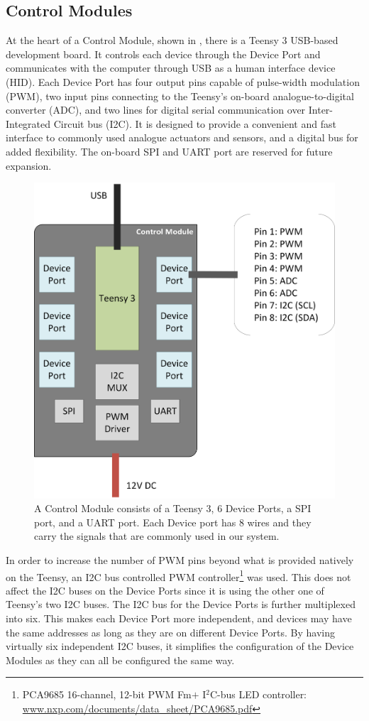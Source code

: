 \subsection{Control Modules}\label{subsec:controller}

At the heart of a Control Module, shown in , there is a Teensy 3 USB-based development board. It controls each device through the Device Port and communicates with the computer through USB as a human interface device (HID). Each Device Port has four output pins capable of pulse-width modulation (PWM), two input pins connecting to the Teensy's on-board analogue-to-digital converter (ADC), and two lines for digital serial communication over Inter-Integrated Circuit bus (I2C). It is designed to provide a convenient and fast interface to commonly used analogue actuators and sensors, and a digital bus for added flexibility. The on-board SPI and UART port are reserved for future expansion.

\begin{figure}[!htbp]
	\centering
	\includegraphics[width=0.68 \textwidth]{"fig/interactive control system/Control_Module"}
	\caption[Block diagram of the Control Module]{A Control Module consists of a Teensy 3, 6 Device Ports, a SPI port, and a UART port. Each Device port has 8 wires and they carry the signals that are commonly used in our system.}
	\label{fig:Control_Module}
\end{figure}

In order to increase the number of PWM pins beyond what is provided natively on the Teensy, an I2C bus controlled PWM controller\footnote{PCA9685 16-channel, 12-bit PWM Fm$+$ I$^2$C-bus LED controller: \url{www.nxp.com/documents/data_sheet/PCA9685.pdf}} was used. This does not affect the I2C buses on the Device Ports since it is using the other one of Teensy's two I2C buses. The I2C bus for the Device Ports is further multiplexed into six. This makes each Device Port more independent, and devices may have the same addresses as long as they are on different Device Ports. By having virtually six independent I2C buses, it simplifies the configuration of the Device Modules as they can all be configured the same way.

